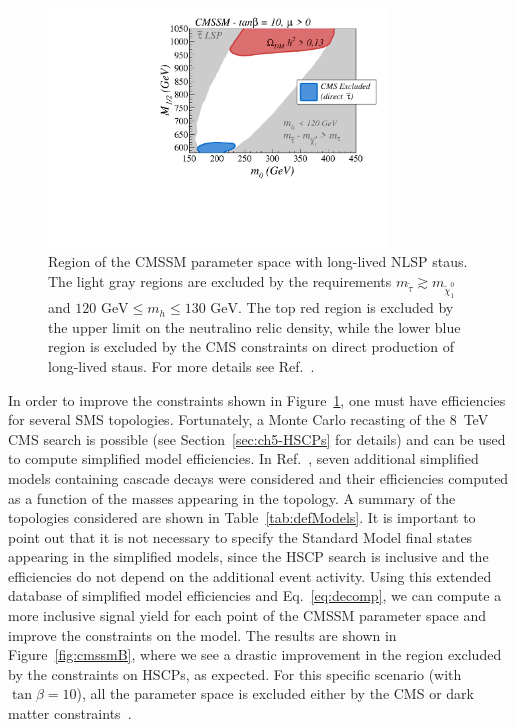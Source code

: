 \begin{figure}[t]
\centering
\includegraphics[width=0.8\textwidth]{ch5-figures/sms_exclusion_direct.pdf}
\caption{Region of the CMSSM parameter space with long-lived NLSP staus.
The light gray regions are excluded by the requirements $m_{\tilde \tau} \gtrsim
m_{\tilde \chi_1^0}$ and $ 120 \mbox{ GeV} \leq m_h \leq 130 \mbox{ GeV}$.
The top red region is excluded by the upper limit on the neutralino relic
density, while the lower blue region is excluded by the CMS constraints
on direct production of long-lived staus. For more details see Ref.~\cite{Heisig:2015yla}.
}
\label{fig:cmssmA}
\end{figure}

In order to improve the constraints shown in Figure~\ref{fig:cmssmA}, one must
have efficiencies for several SMS topologies. Fortunately, a Monte Carlo
recasting of the 8~TeV CMS search is possible (see Section~\ref{sec:ch5-HSCPs} for details)
and can be used to compute simplified model efficiencies.
In Ref.~\cite{Heisig:2015yla}, seven additional simplified models containing
cascade decays were considered and their efficiencies computed as a function of
the masses appearing in the topology. A summary of the topologies considered
are shown in Table~\ref{tab:defModels}. It is important to point out that
it is not necessary to specify the Standard Model final states appearing in the
simplified models, since the HSCP search is inclusive and the efficiencies
do not depend on the additional event activity.
Using this extended database of simplified model efficiencies
and Eq.~\eqref{eq:decomp}, we can compute a more inclusive signal yield for each
point of the CMSSM parameter space and improve the constraints on the model.
The results are shown in Figure~\ref{fig:cmssmB}, where
we see a drastic improvement in the region excluded by
the constraints on HSCPs, as expected.
For this specific scenario (with
$\tan\beta = 10$), all the parameter space is excluded either by the CMS or dark matter
constraints~\cite{Heisig:2015yla}.

